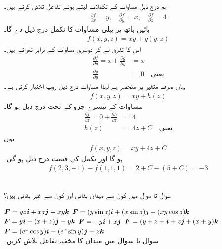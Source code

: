 ہم درج ذیل مساوات کے تکملات لیتے ہوئے تفاعل  تلاش کرتے ہیں۔
\begin{align}\label{مساوات_سمتی_تکمل_مثال_قطعی_تفرقی_الف}
\frac{\partial f}{\partial x}=y,\quad \frac{\partial f}{\partial y}=x,\quad \frac{\partial f}{\partial z}=4
\end{align}
بائیں ہاتھ پر پہلی مساوات کا تکمل درج ذیل دے گا۔
\begin{align}\label{مساوات_سمتی_تکمل_مثال_قطعی_تفرقی_ب}
f(x,y,z)=xy+g(y,z)
\end{align}
اس کا  تفرق لے کر دوسری مساوات کے برابر ٹھراتے ہیں۔
\begin{align*}
\frac{\partial f}{\partial y}=x+\frac{\partial g}{\partial y}&=x\\
\frac{\partial g}{\partial y}&=0\quad \text{یعنی}
\end{align*}
یہاں  صرف متغیر  پر منحصر ہے لہٰذا مساوات  درج ذیل روپ اختیار کرتی ہے۔
\begin{align}
f(x,y,z)=xy+h(z)
\end{align}
مساوات  کے تیسرے جزو کے تحت درج ذیل ہو گا۔
\begin{align*}
\frac{\partial f}{\partial z}=0+\frac{\partial h}{\partial z}&=4\\
h(z)&=4z+C\quad \text{یعنی}
\end{align*}
یوں
\begin{align*}
f(x,y,z)=xy+4z+C
\end{align*}
ہو گا اور تکمل کی قیمت درج ذیل ہو گی۔
\begin{align*}
f(2,3,-1)-f(1,1,1)=2+C-(5+C)=-3
\end{align*}


\\
سوال  تا سوال  میں کون سے میدان بقائی اور کون سے غیر بقائی ہیں؟

\({{\boldsymbol{F}}}=yz{\boldsymbol{i}}+xz{\boldsymbol{j}}+xy{\boldsymbol{k}}\)
\({{\boldsymbol{F}}}=(y\sin z){\boldsymbol{i}}+(x\sin z){\boldsymbol{j}}+(xy\cos z){\boldsymbol{k}}\)
\({{\boldsymbol{F}}}=y{\boldsymbol{i}}+(x+z){\boldsymbol{j}}-y{\boldsymbol{k}}\)
\({{\boldsymbol{F}}}=-y{\boldsymbol{i}}+x{\boldsymbol{j}}\)
\({{\boldsymbol{F}}}=(y+z+{\boldsymbol{i}}+z{\boldsymbol{j}}+(x+y){\boldsymbol{k}}\)
\({{\boldsymbol{F}}}=(e^x \cos y){\boldsymbol{i}}-(e^x\sin y){\boldsymbol{j}}+z{\boldsymbol{k}}\)
\\
سوال  تا سوال  میں میدان  کا مخفیہ تفاعل  تلاش کریں۔

